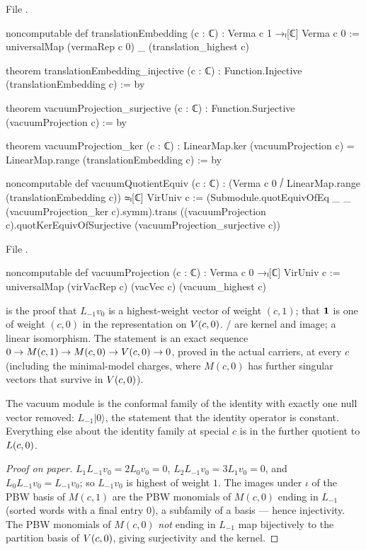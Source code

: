 File .
\begin{leancode}
noncomputable def translationEmbedding (c : ℂ) : Verma c 1 →ₗ[ℂ] Verma c 0 :=
  universalMap (vermaRep c 0) _ (translation_highest c)

theorem translationEmbedding_injective (c : ℂ) :
    Function.Injective (translationEmbedding c) := by

theorem vacuumProjection_surjective (c : ℂ) : Function.Surjective (vacuumProjection c) := by

theorem vacuumProjection_ker (c : ℂ) :
    LinearMap.ker (vacuumProjection c) = LinearMap.range (translationEmbedding c) := by

noncomputable def vacuumQuotientEquiv (c : ℂ) :
    (Verma c 0 ⧸ LinearMap.range (translationEmbedding c)) ≃ₗ[ℂ] VirUniv c :=
  (Submodule.quotEquivOfEq _ _ (vacuumProjection_ker c).symm).trans
    ((vacuumProjection c).quotKerEquivOfSurjective (vacuumProjection_surjective c))
\end{leancode}
File .
\begin{leancode}
noncomputable def vacuumProjection (c : ℂ) : Verma c 0 →ₗ[ℂ] VirUniv c :=
  universalMap (virVacRep c) (vacVec c) (vacuum_highest c)
\end{leancode}

\begin{dictionary}
 is the proof that $L_{-1}v_0$ is a highest-weight vector of weight $(c,1)$;
 that $\mathbf{1}$ is one of weight $(c,0)$ in the representation 
on $V(c,0)$. / are kernel and image;  a linear
isomorphism. The statement is an exact sequence $0\to M(c,1)\to M(c,0)\to V(c,0)\to0$, proved in the actual
carriers, at every $c$ (including the minimal-model charges, where $M(c,0)$ has further singular vectors
that survive in $V(c,0)$).
\end{dictionary}

\begin{physics}
The vacuum module is the conformal family of the identity with exactly one null vector removed:
$L_{-1}|0\rangle$, the statement that the identity operator is constant. Everything else about the identity
family at special $c$ is in the further quotient to $L(c,0)$.
\end{physics}

\begin{proof}[Proof on paper]
$L_1L_{-1}v_0 = 2L_0v_0 = 0$, $L_2L_{-1}v_0 = 3L_1v_0 = 0$, and $L_0L_{-1}v_0 = L_{-1}v_0$; so $L_{-1}v_0$ is
highest of weight $1$. The images under $\iota$ of the PBW basis of $M(c,1)$ are the PBW monomials of
$M(c,0)$ ending in $L_{-1}$ (sorted words with a final entry $0$), a subfamily of a basis --- hence
injectivity. The PBW monomials of $M(c,0)$ \emph{not} ending in $L_{-1}$ map bijectively to the partition
basis of $V(c,0)$, giving surjectivity and the kernel.
\end{proof}

